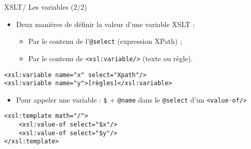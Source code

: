 \documentclass{beamer}
\begin{document}
    \begin{frame}[fragile]{XSLT/ Les variables (2/2)}
        \Large
        \begin{itemize}
            \item Deux manières de définir la valeur d'une variable XSLT :
            \begin{itemize}
                \item Par le contenu de l'\texttt{@select} (expression XPath) ;
                \item Par le contenu de \texttt{<xsl:variable/>} (texte ou règle).
            \end{itemize}
        \end{itemize}
        \normalsize
        \begin{verbatim}
<xsl:variable name="x" select="Xpath"/>
<xsl:variable name="y">[règles]</xsl:variable>
        \end{verbatim}
        \Large
        \begin{itemize}
            \item  Pour appeler une variable : \texttt{\$} + \texttt{@name} dans le \texttt{@select} d'un \texttt{<value-of/>}
        \end{itemize}
        \normalsize
        \begin{verbatim}
<xsl:template math="/">
    <xsl:value-of select="$x"/>
    <xsl:value-of select="$y"/>
</xsl:template>
        \end{verbatim}
    \end{frame}
\end{document}
